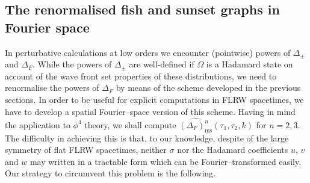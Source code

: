 \documentclass[a4paper,10pt,twoside]{article}
\numberwithin{equation}{section}
\newcounter{and}
\def\ms{\mathrm{ms}}
\theoremstyle{plain}
\theoremstyle{definition}
\begin{document}
\subsection{The renormalised fish and sunset graphs in Fourier space}
\label{sec:sunfishflrw}

In perturbative calculations at low orders we encounter (pointwise) powers of $\Delta_\pm$ and $\Delta_F$. While the powers of $\Delta_\pm$ are well-defined if $\Omega$ is a Hadamard state on account of the wave front set properties of these distributions, we need to renormalise the powers of $\Delta_F$ by means of the scheme developed in the previous sections. In order to be useful for explicit computations in FLRW spacetimes, we have to develop a spatial Fourier--space version of this scheme. Having in mind the application to $\phi^4$ theory, we shall compute $\widehat{(\Delta_{F})^n_\ms}(\tau_1,\tau_2,k)$ for $n=2,3$. The difficulty in achieving this is that, to our knowledge, despite of the large symmetry of flat FLRW spacetimes, neither $\sigma$ nor the Hadamard coefficients $u$, $v$ and $w$ may written in a tractable form which can be Fourier--transformed easily. Our strategy to circumvent this problem is the following.\\\\
\end{document}
